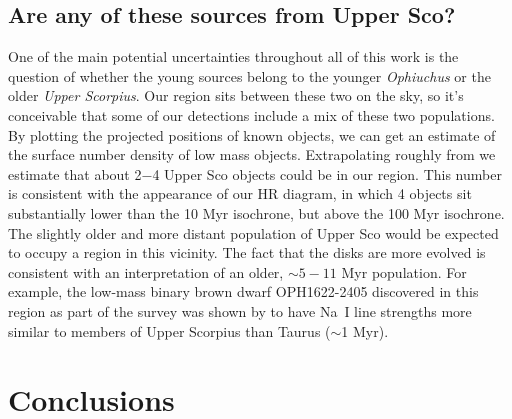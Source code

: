 \subsection{Are any of these sources from Upper Sco?}

One of the main potential uncertainties throughout all of this work is the question of whether the young sources belong to the younger \emph{Ophiuchus} or the older \emph{Upper Scorpius}.  Our region sits between these two on the sky, so it's conceivable that some of our detections include a mix of these two populations.  By plotting the projected positions of known objects, we can get an estimate of the surface number density of low mass objects.  Extrapolating roughly from \citet{2006AJ....131.3016S,2012ApJ...758...31L} we estimate that about 2$-$4 Upper Sco objects could be in our region.  This number is consistent with the appearance of our HR diagram, in which 4 objects sit substantially lower than the 10 Myr isochrone, but above the 100 Myr isochrone.  The slightly older and more distant population of Upper Sco would be expected to occupy a region in this vicinity.  The fact that the disks are more evolved is consistent with an interpretation of an older, $\sim5-11$ Myr population.  For example, the low-mass binary brown dwarf OPH1622-2405 discovered in this region as part of the \citet{allers06} survey was shown by \citet{2007ApJ...659.1629L} to have Na~I line strengths more similar to members of Upper Scorpius than Taurus ($\sim$1 Myr).  

\section{Conclusions}

